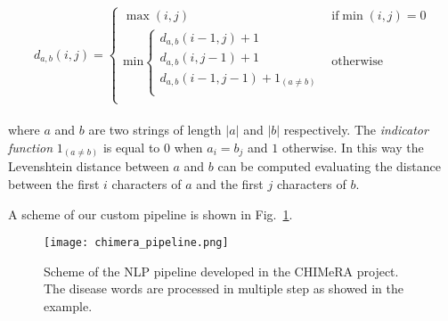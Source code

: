 \documentclass{standalone}
\begin{document}
$$
d_{a, b}(i, j) = \left\{ \begin{array}{rc}
  \max(i, j)                                                       & \mbox{if} \min(i, j) = 0 \\
  \mbox{min} \left\{ \begin{array}{r}
      d_{a, b}(i - 1, j) + 1                     \\
      d_{a, b}(i, j - 1) + 1                     \\
      d_{a, b}(i - 1, j - 1) + 1_{(a \neq b)}    \\
    \end{array}
    \right.                                                        & \mbox{otherwise}         \\

  \end{array}
  \right.
$$
\\
where $a$ and $b$ are two strings of length $|a|$ and $|b|$ respectively.
The \emph{indicator function} $1_{(a \neq b)}$ is equal to $0$ when $a_i = b_j$ and $1$ otherwise.
In this way the Levenshtein distance between $a$ and $b$ can be computed evaluating the distance between the first $i$ characters of $a$ and the first $j$ characters of $b$.

A scheme of our custom pipeline is shown in Fig.~\ref{fig:chimera_pipe}.

\begin{figure}[htbp]
\centering
\texttt{[image: chimera\_pipeline.png]}
\caption{Scheme of the NLP pipeline developed in the CHIMeRA project.
The disease words are processed in multiple step as showed in the example.
}
\label{fig:chimera_pipe}
\end{figure}

\end{document}
